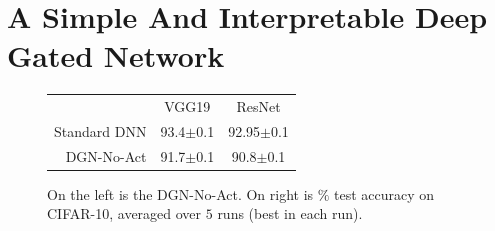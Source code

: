 \section{A Simple And Interpretable Deep Gated  Network}\label{sec:interpret}
\begin{figure}
\centering
\begin{minipage}{0.3\columnwidth}
\centering
{}
\end{minipage}
\begin{minipage}{0.4\columnwidth}
\begin{tabular}{rcc}
\toprule
&VGG19 & ResNet\\
Standard DNN&93.4\tiny{$\pm$0.1} &92.95\tiny{$\pm$0.1} \\
DGN-No-Act&91.7\tiny{$\pm$0.1}&90.8\tiny{$\pm$0.1} \\
\bottomrule
\end{tabular}
\end{minipage}
\caption{\small On the left is the DGN-No-Act. On right is $\%$ test accuracy on CIFAR-10, averaged over $5$ runs (best in each run).}
\label{fig:dgn-no-act}
\end{figure}
